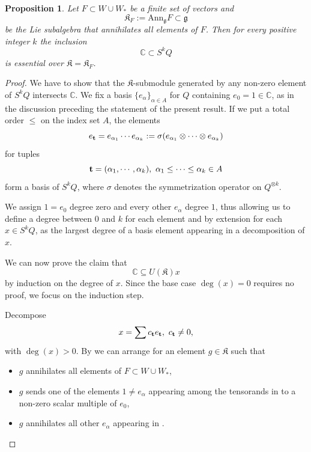 \documentclass[11pt]{article}
\theoremstyle{plain}
\newtheorem{proposition}[lemma]{Proposition}
\theoremstyle{nonumberplain}
\theoremstyle{plain}
\numberwithin{equation}{section}
\theoremstyle{nonumberplain}
\newtheorem{proof}{Proof}
\newcommand\bC{{\mathbb C}}
\newcommand\fK{{\mathfrak K}}
\newcommand\fg{{\mathfrak g}}
\newcommand\1{{\bf 1}}
\begin{document}
\begin{proposition}\label{pr.ann}
  Let $F\subset W\cup W_*$ be a finite set of vectors and
  \begin{equation*}
   \fK_{F}:=\mathrm{Ann}_{\fg}F\subset\fg 
  \end{equation*}
  be the Lie subalgebra that annihilates all elements of $F$. Then for every positive integer $k$ the inclusion
  \begin{equation*}
    \bC\subset S^kQ
  \end{equation*}
  is essential over $\fK=\fK_F$.
\end{proposition}
\begin{proof}
  We have to show that the $\fK$-submodule generated by any non-zero element of $S^kQ$ intersects $\bC$. We fix a basis $\{e_{\alpha}\}_{\alpha\in A}$ for $Q$ containing $e_0=1\in \bC$, as in the discussion preceding the statement of the present result. If we put a total order $\le $ on the index set $A$, the elements
  \begin{equation}\label{eq:10}
    e_{\bf t}=e_{\alpha_1}\cdots e_{\alpha_k}:=\sigma(e_{\alpha_1}\otimes \cdots\otimes e_{\alpha_k})
  \end{equation}
  for tuples
  \begin{equation*}
    {\bf t}=(\alpha_1,\cdots,\alpha_k),\ \alpha_1\le \cdots\le \alpha_k\in A
  \end{equation*}
  form a basis of $S^kQ$, where $\sigma$ denotes the symmetrization operator on $Q^{\otimes k}$.

  We assign $1=e_0$ degree zero and every other $e_{\alpha}$ degree $1$, thus allowing us to define a degree between $0$ and $k$ for each element  and by extension for each $x\in S^kQ$, as the largest degree of a basis element  appearing in a decomposition of $x$.

  We can now prove the claim that
  \begin{equation*}
    \bC\subseteq U(\fK)x
  \end{equation*}
  by induction on the degree of $x$. Since the base case $\deg(x)=0$ requires no proof, we focus on the induction step.

  Decompose
  \begin{equation}\label{eq:11}
    x=\sum c_{\bf t}e_{\bf t},\ c_{\bf t}\ne 0,
  \end{equation}
  with $\deg(x)>0$. By  we can arrange for an element $g\in \fK$ such that
  \begin{itemize}
  \item[$-$] $g$ annihilates all elements of $F\subset W\cup W_*$,
  \item[$-$] $g$ sends one of the elements $1\ne e_{\alpha}$ appearing among the tensorands in  to a non-zero scalar multiple of $e_0$,
  \item[$-$] $g$ annihilates all other $e_{\alpha}$ appearing in .
  \end{itemize}


\end{proof}
\end{document}
